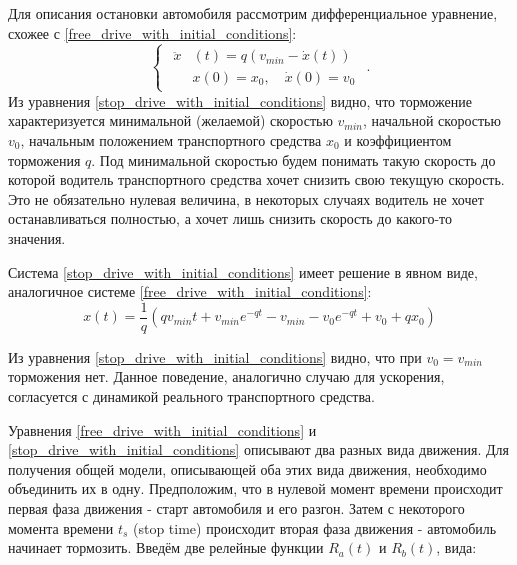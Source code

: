\documentclass[12pt, a4paper]{extarticle}
\numberwithin{equation}{section}
\numberwithin{figure}{section}
\begin{document}
Для описания остановки автомобиля рассмотрим дифференциальное уравнение, схожее с \eqref{free_drive_with_initial_conditions}: 
\begin{equation} \label{stop_drive_with_initial_conditions}
\begin{cases}
\begin{split}
\ddot{x}&(t) = q\left( v_{min} - \dot{x}(t)\right) \\
&x(0)=x_0, \quad \dot{x}(0)=v_0
\end{split}
\end{cases}.
\end{equation}
Из уравнения \eqref{stop_drive_with_initial_conditions} видно, что торможение характеризуется минимальной (желаемой) скоростью $v_{min}$, начальной скоростью $v_{0}$, начальным положением транспортного средства $x_0$ и коэффициентом торможения $q$. Под минимальной скоростью будем понимать такую скорость до которой водитель транспортного средства хочет снизить свою текущую скорость. Это не обязательно нулевая величина, в некоторых случаях водитель не хочет останавливаться полностью, а хочет лишь снизить скорость до какого-то значения.

Система \eqref{stop_drive_with_initial_conditions} имеет решение в явном виде, аналогичное системе \eqref{free_drive_with_initial_conditions}:
\begin{equation*}
x(t) = \dfrac{1}{q}\left(qv_{min}t+v_{min}e^{-qt}-v_{min}-v_0e^{-qt}+v_0+qx_0\right) 
\end{equation*}

Из уравнения \eqref{stop_drive_with_initial_conditions} видно, что при $v_0=v_{min}$ торможения нет. Данное поведение, аналогично случаю для ускорения, согласуется с динамикой реального транспортного средства.

Уравнения \eqref{free_drive_with_initial_conditions} и  \eqref{stop_drive_with_initial_conditions} описывают два разных вида движения. Для получения общей модели, описывающей оба этих вида движения, необходимо объединить их в одну. Предположим, что в нулевой момент времени происходит первая фаза движения - старт автомобиля и его разгон. Затем с некоторого момента времени $t_s$ (stop time) происходит вторая фаза движения - автомобиль начинает тормозить. Введём две релейные функции $R_{a}(t)$ и $R_{b}(t)$, вида:  
\end{document}
